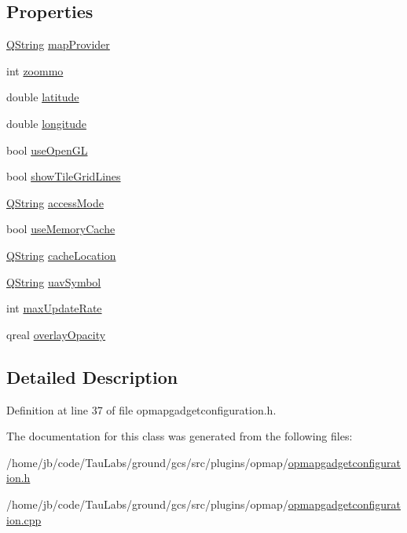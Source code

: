 \subsection*{\-Properties}
\begin{DoxyCompactItemize}
\item 
\hyperlink{group___u_a_v_objects_plugin_gab9d252f49c333c94a72f97ce3105a32d}{\-Q\-String} \hyperlink{group___o_p_map_plugin_ga6796d346f4d9edbe710a92a987f88659}{map\-Provider}
\item 
int \hyperlink{group___o_p_map_plugin_gac07e4414a740f31223ffb1ce430ca3e8}{zoommo}
\item 
double \hyperlink{group___o_p_map_plugin_gaadef11a946190d55fa1bc45821414b77}{latitude}
\item 
double \hyperlink{group___o_p_map_plugin_ga7832a8e775f6e51898ad0075b150ccd5}{longitude}
\item 
bool \hyperlink{group___o_p_map_plugin_gae922073575fb74cc0fa15b73223982ac}{use\-Open\-G\-L}
\item 
bool \hyperlink{group___o_p_map_plugin_gaa46dc27228fb9c47c0c10f520d6099ab}{show\-Tile\-Grid\-Lines}
\item 
\hyperlink{group___u_a_v_objects_plugin_gab9d252f49c333c94a72f97ce3105a32d}{\-Q\-String} \hyperlink{group___o_p_map_plugin_ga1b705326683a741d51646ad6c16a0687}{access\-Mode}
\item 
bool \hyperlink{group___o_p_map_plugin_gae936e72883265ab40e9b30a0baaed122}{use\-Memory\-Cache}
\item 
\hyperlink{group___u_a_v_objects_plugin_gab9d252f49c333c94a72f97ce3105a32d}{\-Q\-String} \hyperlink{group___o_p_map_plugin_ga182bffa488612f55a34e696590887dbf}{cache\-Location}
\item 
\hyperlink{group___u_a_v_objects_plugin_gab9d252f49c333c94a72f97ce3105a32d}{\-Q\-String} \hyperlink{group___o_p_map_plugin_ga34e796aad89f226209a7325c28af859a}{uav\-Symbol}
\item 
int \hyperlink{group___o_p_map_plugin_ga3ab3b510f0eb2b7cd3b183275eba0be1}{max\-Update\-Rate}
\item 
qreal \hyperlink{group___o_p_map_plugin_gaf1bf43458d17cdb95a80a889c5508945}{overlay\-Opacity}
\end{DoxyCompactItemize}


\subsection{\-Detailed \-Description}


\-Definition at line 37 of file opmapgadgetconfiguration.\-h.



\-The documentation for this class was generated from the following files\-:\begin{DoxyCompactItemize}
\item 
/home/jb/code/\-Tau\-Labs/ground/gcs/src/plugins/opmap/\hyperlink{opmapgadgetconfiguration_8h}{opmapgadgetconfiguration.\-h}\item 
/home/jb/code/\-Tau\-Labs/ground/gcs/src/plugins/opmap/\hyperlink{opmapgadgetconfiguration_8cpp}{opmapgadgetconfiguration.\-cpp}\end{DoxyCompactItemize}
